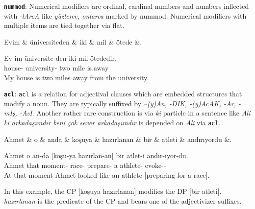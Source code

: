 \documentclass[11pt,a4paper]{article}
\begin{document}
\textbf{\texttt{nummod}}:
Numerical modifiers are ordinal, cardinal numbers and numbers inflected with \textit{-lArcA} like \textit{yüzlerce, onlarca} marked by nummod. Numerical modifiers with multiple items are tied together via flat.

\begin{exe}
\ex \label{nummod}
\begin{dependency}
\begin{deptext}[column sep=0.32cm]
Evim \& üniversiteden \& iki \& mil \& ötede \&. \\
\end{deptext}
\end{dependency}
\gll Ev-im üniversite-den iki mil ötededir.  \\
house-\Fsg{} university-\Abl{} two mile is.away\\
\glt My house is two miles away from the university.
\end{exe}

\textbf{\texttt{acl}}:
\texttt{acl} is a relation for adjectival clauses which are embedded structures that modify a noun. They are typically suffixed by \textit{–(y)An, -DIK, -(y)AcAK, -Ar, -mIş, -AsI}. Another rather rare construction is via \textit{ki} particle in a sentence like \textit{Ali ki arkadaşımdır beni çok sever arkadaşımdır} is depended on \textit{Ali} via \texttt{acl}.

\begin{exe}
\ex \label{acl}
\begin{dependency}
\begin{deptext}[column sep=0.32cm]
Ahmet \& o \& anda \& koşuya \& hazırlanan \& bir \& atleti \& andırıyordu \&. \\
\end{deptext}
\end{dependency}
\gll Ahmet o an-da [koşu-ya hazırlan-an] bir atlet-i andır-ıyor-du. \\
Ahmet that moment-\Loc{} race-\Dat{} prepare-\Ptcp{} a athlete-\Acc{} evoke-\Prog{}-\Pst{}\\
\glt At that moment Ahmet looked like an athlete [preparing for a race].
\end{exe}

In this example, the CP [koşuya hazırlanan] modifies the DP [bir atleti]. \textit{hazırlanan} is the predicate of the CP and bears one of the adjectivizer suffixes.
\end{document}
